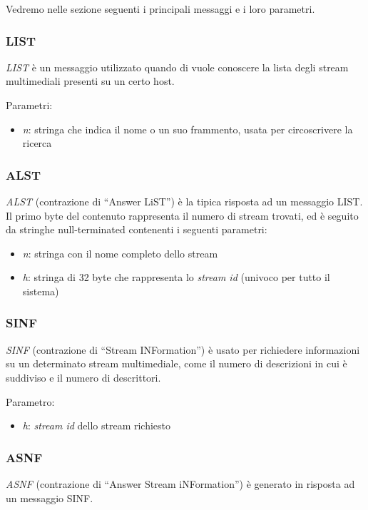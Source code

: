 Vedremo nelle sezione seguenti i principali messaggi e i loro parametri.




\subsubsection*{LIST}
%
\emph{LIST} è un messaggio utilizzato quando di vuole conoscere la lista degli
stream multimediali presenti su un certo host.

Parametri:
\begin{itemize}
  \item \emph{n}: stringa che indica il nome o un suo frammento, usata per
  circoscrivere la ricerca
\end{itemize}

\subsubsection*{ALST}
%
\emph{ALST} (contrazione di ``Answer LiST'') è la tipica risposta ad un
messaggio LIST. Il primo byte del contenuto rappresenta il numero di stream
trovati, ed è seguito da stringhe null-terminated contenenti i seguenti
parametri:
\begin{itemize}
  \item \emph{n}: stringa con il nome completo dello stream
  \item \emph{h}: stringa di 32 byte che rappresenta lo \emph{stream id}
  (univoco per tutto il sistema)
\end{itemize}

\subsubsection*{SINF}
\emph{SINF} (contrazione di ``Stream INFormation'') è usato per richiedere
informazioni su un determinato stream multimediale, come il numero di
descrizioni in cui è suddiviso e il numero di descrittori.

Parametro:
\begin{itemize}
  \item \emph{h}: \emph{stream id} dello stream richiesto
\end{itemize}

\subsubsection*{ASNF}
%
\emph{ASNF} (contrazione di ``Answer Stream iNFormation'') è generato in
risposta ad un messaggio SINF.

